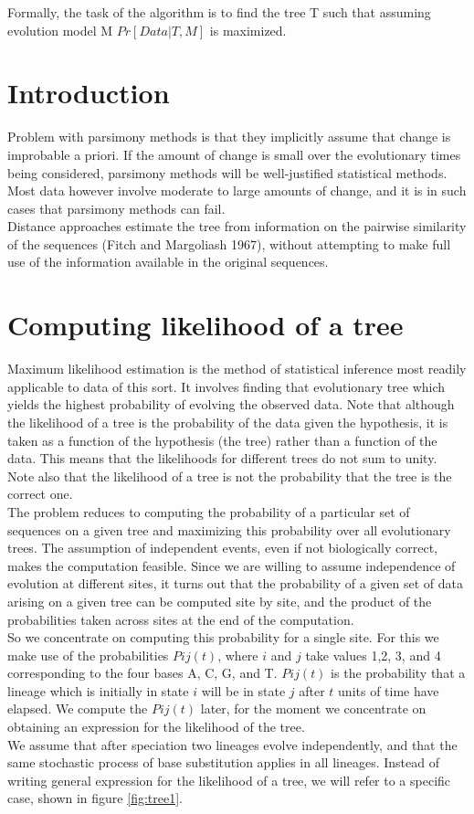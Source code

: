Formally, the task of the algorithm is to find the tree T such that assuming evolution model M $Pr[Data| T,M]$ is maximized.

\section{Introduction}
Problem with parsimony methods is that they implicitly assume that change is improbable a priori. If the amount of change is small over the evolutionary times being considered, parsimony methods will be well-justified statistical methods.
Most data however involve moderate to large amounts of change, and it is in such cases that parsimony methods can fail.
\\
Distance approaches estimate the tree from information on the pairwise similarity of the sequences (Fitch and Margoliash 1967), without attempting to make full use of the information available in the original sequences.

\section{Computing likelihood of a tree }
Maximum likelihood estimation is the method of statistical inference most readily applicable to data of this sort. It involves finding that evolutionary tree which yields the highest probability of evolving the observed data. 
Note that although the likelihood of a tree is the probability of the data given the hypothesis, it is taken as a function of the hypothesis (the tree) rather than a function of the data. This means that the likelihoods for different trees do not sum to unity.
Note also that the likelihood of a tree is not the probability that the tree is the correct one.
\\
The problem reduces to computing the probability of a particular set of sequences on a given tree and maximizing this probability over all evolutionary trees.
The assumption of independent events, even if not biologically correct, makes the computation feasible. 
Since we are willing to assume independence of evolution at different sites, it turns out that the probability of a given set of data arising on a given tree can be computed site by site, and the product of the probabilities taken across sites at the end of the computation.
\\
So we concentrate on computing this probability for a single site. 
For this we make use of the probabilities $Pij(t)$, where $i$ and $j$ take values 1,2, 3, and 4 corresponding to the four bases A, C, G, and T. $Pij(t)$ is the probability that a lineage which is initially in state $i$ will be in state $j$ after $t$ units of time have elapsed. We compute the $Pij(t)$ later, for the moment
we concentrate on obtaining an expression for the likelihood of the tree.
\\
We assume that after speciation two lineages evolve independently, and that the same stochastic process of base substitution applies in all lineages.
Instead of writing general expression for the likelihood of a tree, we will refer to a specific case, shown in figure \ref{fig:tree1}.


